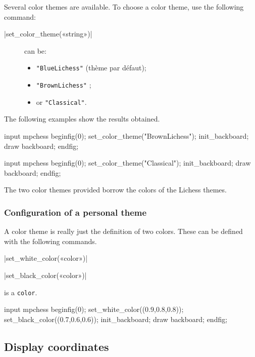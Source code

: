 \documentclass[english]{ltxdoc}
\begin{document}
Several color themes are available. To choose a color theme, use the following
command:

\commande|set_color_theme(«string»)|\smallskip{}

\begin{description}
  \item[] can be:
\begin{itemize}
\item \lstinline+"BlueLichess"+ (thème par défaut);
\item \lstinline+"BrownLichess"+ ;
\item or \lstinline+"Classical"+.
\end{itemize}
\end{description}

The following examples show the results obtained.
\begin{ExempleMP}
input mpchess
beginfig(0);
set_color_theme("BrownLichess");
init_backboard;
draw backboard;
endfig;
\end{ExempleMP}
\begin{ExempleMP}
input mpchess
beginfig(0);
set_color_theme("Classical");
init_backboard;
draw backboard;
endfig;
\end{ExempleMP}

The two color themes provided borrow the colors of the Lichess themes.


\subsubsection{Configuration of a personal theme}

A color theme is really just the definition of two colors.
These can be defined with the following commands.

\commande|set_white_color(«color»)|\par
\commande|set_black_color(«color»)|\smallskip

 is a \MP{} \lstinline+color+.

\begin{ExempleMP}
input mpchess
beginfig(0);
set_white_color((0.9,0.8,0.8));
set_black_color((0.7,0.6,0.6));
init_backboard;
draw backboard;
endfig;
\end{ExempleMP}
\subsection{Display coordinates}
\end{document}
